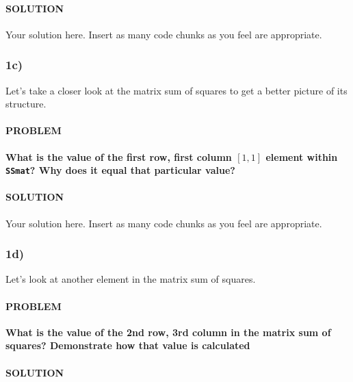 \documentclass[
]{article}
\begin{document}
\hypertarget{solution-1}{%
\paragraph{SOLUTION}\label{solution-1}}

Your solution here. Insert as many code chunks as you feel are
appropriate.

\hypertarget{c}{%
\subsubsection{1c)}\label{c}}

Let's take a closer look at the matrix sum of squares to get a better
picture of its structure.

\hypertarget{problem-2}{%
\paragraph{PROBLEM}\label{problem-2}}

\textbf{What is the value of the first row, first column
\(\left[1,1\right]\) element within \texttt{SSmat}? Why does it equal
that particular value?}

\hypertarget{solution-2}{%
\paragraph{SOLUTION}\label{solution-2}}

Your solution here. Insert as many code chunks as you feel are
appropriate.

\hypertarget{d}{%
\subsubsection{1d)}\label{d}}

Let's look at another element in the matrix sum of squares.

\hypertarget{problem-3}{%
\paragraph{PROBLEM}\label{problem-3}}

\textbf{What is the value of the 2nd row, 3rd column in the matrix sum
of squares? Demonstrate how that value is calculated}

\hypertarget{solution-3}{%
\paragraph{SOLUTION}\label{solution-3}}
\end{document}
